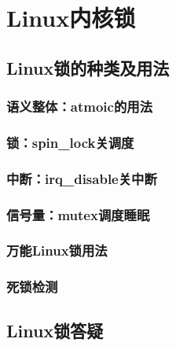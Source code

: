 
\part{Linux内核锁}

\chapter{Linux锁的种类及用法}

\section{语义整体：atmoic的用法}

\section{锁：spin\_lock关调度}

\section{中断：irq\_disable关中断}

\section{信号量：mutex调度睡眠}

\section{万能Linux锁用法}

\section{死锁检测}

\chapter{Linux锁答疑}
